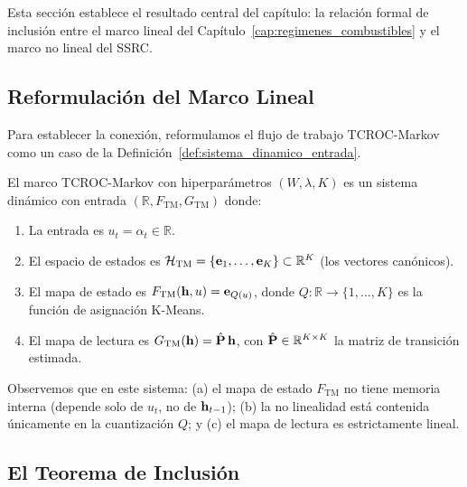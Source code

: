 Esta sección establece el resultado central del capítulo: la
relación formal de inclusión entre el marco lineal del
Capítulo~\ref{cap:regimenes_combustibles} y el marco no lineal del
SSRC.

\subsection{Reformulación del Marco Lineal}
\label{subsec:reformulacion_lineal}

Para establecer la conexión, reformulamos el flujo de trabajo
TCROC-Markov como un caso de la
Definición~\ref{def:sistema_dinamico_entrada}.

\begin{definition}
\label{def:tcroc_como_sistema}
El marco TCROC-Markov con hiperparámetros $(W, \lambda, K)$ es un
sistema dinámico con entrada
$(\mathbb{R}, F_{\text{TM}}, G_{\text{TM}})$ donde:
\begin{enumerate}
    \item La entrada es $u_t = \alpha_t \in \mathbb{R}$.
    \item El espacio de estados es $\mathcal{H}_{\text{TM}} =
    \{\mathbf{e}_1, \ldots, \mathbf{e}_K\} \subset \mathbb{R}^K$
    (los vectores canónicos).
    \item El mapa de estado es
    $F_{\text{TM}}(\mathbf{h}, u) = \mathbf{e}_{Q(u)}$, donde
    $Q: \mathbb{R} \to \{1, \ldots, K\}$ es la función de
    asignación K-Means.
    \item El mapa de lectura es
    $G_{\text{TM}}(\mathbf{h}) = \hat{\mathbf{P}}\,\mathbf{h}$,
    con $\hat{\mathbf{P}} \in \mathbb{R}^{K \times K}$ la matriz
    de transición estimada.
\end{enumerate}
\end{definition}

Observemos que en este sistema: (a) el mapa de estado $F_{\text{TM}}$
no tiene memoria interna (depende solo de $u_t$, no de
$\mathbf{h}_{t-1}$); (b) la no linealidad está contenida únicamente
en la cuantización $Q$; y (c) el mapa de lectura es estrictamente
lineal.

\subsection{El Teorema de Inclusión}
\label{subsec:teorema_inclusion}

